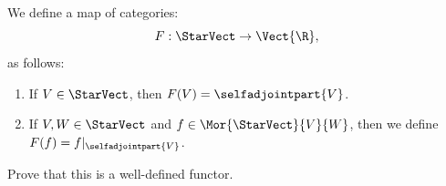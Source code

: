 %
%
\label {ex: functor from a star vector space to selfadjoint elements}We define a map of categories:
\[F: \StarVect \to \Vect{\R},\]
as follows:
\begin{enumerate}
    \item If $V \in \StarVect$, then $F(V) = \selfadjointpart{V}$.
    \item If $V,W \in \StarVect$ and $f \in \Mor{\StarVect}{V}{W}$, then we define $F(f) = f|_{\selfadjointpart{V}}$.
\end{enumerate}
Prove that this is a well-defined functor.
